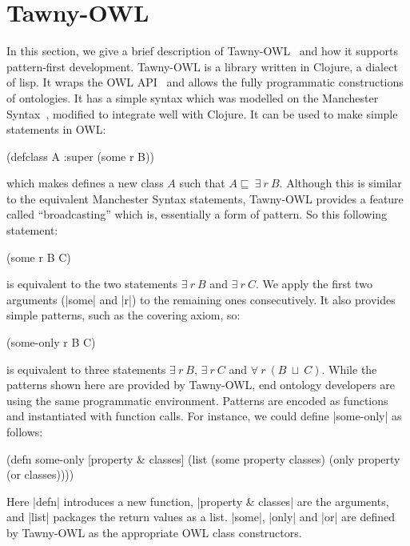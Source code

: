 \documentclass{icbo}
\newcommand{\tawny}{Tawny-OWL\xspace}
\begin{document}
\section{\tawny}
\label{sec:tawny}

In this section, we give a brief description of \tawny~\citep{tawny}
and how it supports pattern-first development. \tawny is a library
written in Clojure, a dialect of lisp. It wraps the OWL
API~\citep{owlapi} and allows the fully programmatic constructions of
ontologies. It has a simple syntax which was modelled on the
Manchester Syntax~\citep{ms2}, modified to integrate well with
Clojure. It can be used to make simple statements in OWL:

\begin{tcode}
(defclass A :super (some r B))
\end{tcode}

which makes defines a new class $A$ such that
$A\sqsubseteq~\exists~r~B$. Although this is similar to the equivalent
Manchester Syntax statements, \tawny provides a feature called
``broadcasting'' which is, essentially a form of pattern. So this
following statement:

\begin{tcode}
(some r B C)
\end{tcode}

is equivalent to the two statements $\exists~r~B$ and
$\exists~r~C$. We apply the first two arguments (|some| and |r|) to
the remaining ones consecutively.  It also provides simple patterns,
such as the covering axiom, so:

\begin{tcode}
(some-only r B C)
\end{tcode}

is equivalent to three statements $\exists~r~B$, $\exists~r~C$ and
$\forall~r~(B~\sqcup~C)$. While the patterns shown here are provided
by \tawny, end ontology developers are using the same programmatic
environment.  Patterns are encoded as functions and instantiated with
function calls. For instance, we could define |some-only| as follows:

\begin{tcode}
(defn some-only [property & classes]
 (list (some property classes)
       (only property
             (or classes))))
\end{tcode}
           
Here |defn| introduces a new function, |property & classes| are the
arguments, and |list| packages the return values as a list. |some|,
|only| and |or| are defined by \tawny as the appropriate OWL class
constructors.
\end{document}
